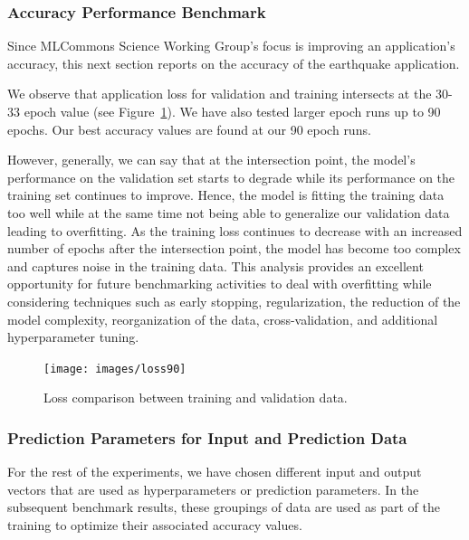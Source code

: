 \subsubsection{Accuracy Performance Benchmark}
\label{sec:perf-accuracy}

Since MLCommons Science Working Group's focus is improving an application’s accuracy, this next section reports on the accuracy of the earthquake application.

We observe that application loss for validation and training intersects at the 30-33 epoch value (see Figure~\ref{fig:loss}). We have also tested larger epoch runs up to 90 epochs. Our best accuracy values are found at our 90 epoch runs.

However, generally, we can say that at the intersection point, the model's performance on the validation set starts to degrade while its performance on the training set continues to improve. Hence, the  model is fitting the training data too well while at the same time not being able to generalize our validation data leading to overfitting. As the training loss continues to decrease with an increased number of epochs after the intersection point, the model has become too complex and captures noise in the training data. This analysis provides an excellent opportunity for future benchmarking activities to deal with overfitting while considering techniques such as early stopping, regularization, the reduction of the model complexity, reorganization of the data, cross-validation, and additional hyperparameter tuning. 

\begin{figure}[htb]
    \centering
    \texttt{[image: images/loss90]}
    \caption{Loss comparison between training and validation data.}
    \label{fig:loss}
\end{figure}


\subsubsection{Prediction Parameters for Input and Prediction Data}

For the rest of the experiments, we have chosen different input and output vectors that are used as hyperparameters or prediction parameters. In the subsequent benchmark results, these groupings of data are used as part of the training to optimize their associated accuracy values. 

